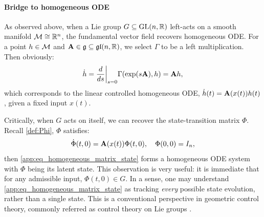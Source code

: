 \paragraph{Bridge to homogeneous ODE}
\label{app:bridge_to_hom_LPV}
As observed above, when a Lie group $G \subseteq \text{GL}(n,\mathbb{R})$ left-acts on a smooth manifold $\mathcal{M} \cong \mathbb{R}^n$,
the fundamental vector field recovers homogeneous ODE.
For a point $h \in \mathcal{M}$ and $\mathbf{A} \in \mathfrak{g} \subseteq \mathfrak{gl}(n,\mathbb{R})$, we select $\Gamma$ to be a left multiplication.
Then obviously:
\begin{equation*}
    \dot{h} = \frac{d}{ds}\bigg\vert_{s=0}\Gamma(\exp(s\mathbf{A}), h) = \mathbf{A}h,
\end{equation*}
which corresponds to the linear controlled homogeneous ODE, $\dot{h}(t) = \mathbf{A}(x(t))h(t)$, given a fixed input $x(t)$.

Critically, when $G$ acts on itself, we can recover the state-transition matrix $\Phi$.
Recall \cref{def:Phi}, $\Phi$ satisfies:
\begin{equation}
\label{app:eq_homogeneous_matrix_state}
    \dot{\Phi}(t,0) = \mathbf{A}(x(t))\Phi(t,0), \quad \Phi(0,0) = I_n,
\end{equation}
then \cref{app:eq_homogeneous_matrix_state} forms a homogeneous ODE system with $\Phi$ being its latent state.
This observation is very useful:
it is immediate that for any admissible input, $\Phi(t,0) \in G$.
In a sense, one may understand \cref{app:eq_homogeneous_matrix_state}
as tracking \emph{every} possible state evolution, rather than a single state.
This is a conventional perspective in geometric control theory,
commonly referred as control theory on Lie groups \cite{jurdjevic1972control, iserles2008magnus}.

